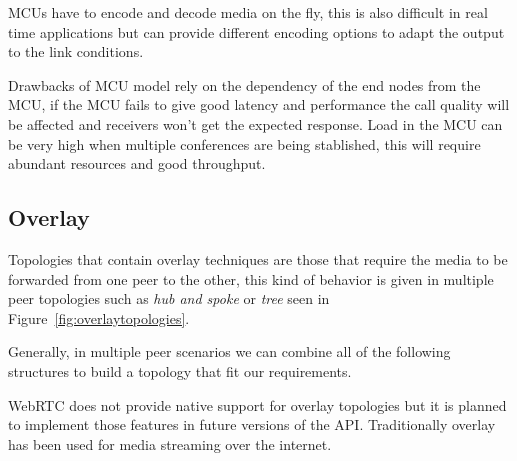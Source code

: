 MCUs have to encode and decode media on the fly, this is also difficult in real time applications but can provide different encoding options to adapt the output to the link conditions.

Drawbacks of MCU model rely on the dependency of the end nodes from the MCU, if the MCU fails to give good latency and performance the call quality will be affected and receivers won't get the expected response. Load in the MCU can be very high when multiple conferences are being stablished, this will require abundant resources and good throughput.

\subsection{Overlay}

Topologies that contain overlay techniques are those that require the media to be forwarded from one peer to the other, this kind of behavior is given in multiple peer topologies such as {\it hub and spoke} or {\it tree} seen in Figure~\ref{fig:overlaytopologies}.

Generally, in multiple peer scenarios we can combine all of the following structures to build a topology that fit our requirements.

WebRTC does not provide native support for overlay topologies but it is planned to implement those features in future versions of the API. Traditionally overlay has been used for media streaming over the internet.

